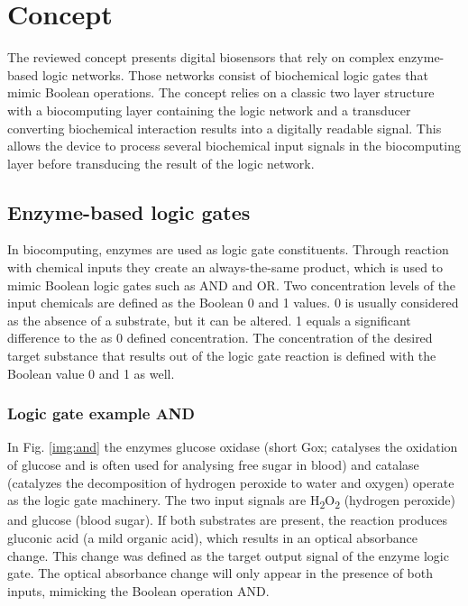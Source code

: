 \documentclass[runningheads]{llncs}
\begin{document}
\section{Concept}

The reviewed concept presents digital biosensors that rely on complex enzyme-based logic networks. Those networks consist of biochemical logic gates that mimic Boolean operations. The concept relies on a classic two layer structure with a biocomputing layer containing the logic network and a transducer converting biochemical interaction results into a digitally readable signal. This allows the device to process several biochemical input signals in the biocomputing layer before transducing the result of the logic network. \cite{application review}\cite{original}\cite{state of the art}


\subsection{Enzyme-based logic gates}		
		In biocomputing, enzymes are used as logic gate constituents. Through reaction with chemical inputs they create an always-the-same product, which is used to mimic Boolean logic gates such as AND and OR. Two concentration levels of the input chemicals are defined as the Boolean 0 and 1 values. 0 is usually considered as the absence of a substrate, but it can be altered. 1 equals a significant difference to the as 0 defined concentration. 
		The concentration of the desired target substance that results out of the logic gate reaction is defined with the Boolean value 0 and 1 as well. \cite{original}\cite{haupt}
	
		\subsubsection{Logic gate example AND}
		In Fig. \ref{img:and} the enzymes glucose oxidase (short Gox; catalyses the oxidation of glucose and is often used for analysing free sugar in blood) and catalase (catalyzes the decomposition of hydrogen peroxide to water and oxygen) operate as the logic gate machinery. The two input signals are H\textsubscript{2}O\textsubscript{2} (hydrogen peroxide) and glucose (blood sugar)\cite{chemie2}. If both substrates are present, the reaction produces gluconic acid (a mild organic acid), which results in an optical absorbance change. This change was defined as the target output signal of the enzyme logic gate. The optical absorbance change will only appear in the presence of both inputs, mimicking the Boolean operation AND. \cite{original}\cite{haupt}\cite{chemie}
\end{document}
